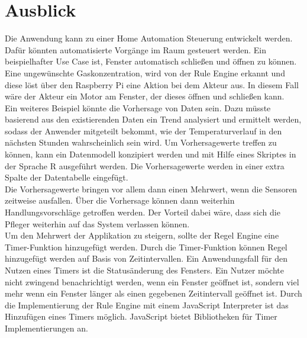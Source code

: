 \chapter{Ausblick}

Die Anwendung kann zu einer Home Automation Steuerung entwickelt werden. Dafür könnten automatisierte Vorgänge im Raum gesteuert werden. Ein beispielhafter Use Case ist, Fenster automatisch schließen und öffnen zu können. Eine ungewünschte Gaskonzentration, wird von der Rule Engine erkannt und diese löst über den Raspberry Pi eine Aktion bei dem Akteur aus. In diesem Fall wäre der Akteur ein Motor am Fenster, der dieses öffnen und schließen kann.\\
Ein weiteres Beispiel könnte die Vorhersage von Daten sein. Dazu müsste basierend aus den existierenden Daten ein Trend analysiert und ermittelt werden, sodass der Anwender mitgeteilt bekommt, wie der Temperaturverlauf in den nächsten Stunden wahrscheinlich sein wird. Um Vorhersagewerte treffen zu können, kann ein Datenmodell konzipiert werden und mit Hilfe eines Skriptes in der Sprache R ausgeführt werden. Die Vorhersagewerte werden in einer extra Spalte der Datentabelle eingefügt.\\
Die Vorhersagewerte bringen vor allem dann einen Mehrwert, wenn die Sensoren zeitweise ausfallen. Über die Vorhersage können dann weiterhin Handlungsvorschläge getroffen werden. Der Vorteil dabei wäre, dass sich die Pfleger weiterhin auf das System verlassen können.\\

Um den Mehrwert der Applikation zu steigern, sollte der Regel Engine eine Timer-Funktion hinzugefügt werden. Durch die Timer-Funktion können Regel hinzugefügt werden auf Basis von Zeitintervallen. Ein Anwendungsfall für den Nutzen eines Timers ist die Statusänderung des Fensters. Ein Nutzer möchte nicht zwingend benachrichtigt werden, wenn ein Fenster geöffnet ist, sondern viel mehr wenn ein Fenster länger als einen gegebenen Zeitintervall geöffnet ist. Durch die Implementierung der Rule Engine mit einem JavaScript Interpreter ist das Hinzufügen eines Timers möglich. JavaScript bietet Bibliotheken für Timer Implementierungen an.\\
